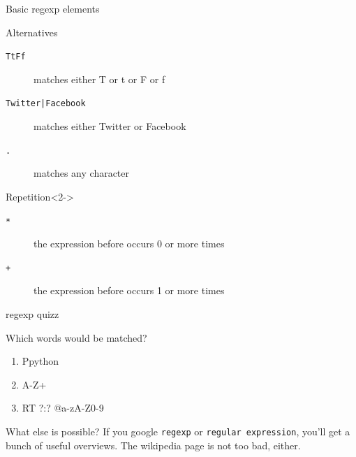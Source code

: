 \documentclass{beamer}
\begin{document}
\begin{frame}{Basic regexp elements}
\begin{block}{Alternatives}
\begin{description}
\item[{\tt{\lbrack TtFf\rbrack}}] matches either T or t or F or f
\item[{\tt{Twitter|Facebook}}] matches either Twitter or Facebook
\item[{\tt{.}}] matches any character
\end{description}
\end{block}
\begin{block}{Repetition}<2->
\begin{description}
\item[{\tt{*}}] the expression before occurs 0 or more times
\item[{\tt{+}}] the expression before occurs 1 or more times
\end{description}
\end{block}
\end{frame}

\begin{frame}{regexp quizz}
\begin{block}{Which words would be matched?}
\tt
\begin{enumerate}
\item<1-> \lbrack Pp\rbrack ython
\item<2-> \lbrack A-Z\rbrack +
\item<3-> RT ?:? @\lbrack a-zA-Z0-9\rbrack *
\end{enumerate}
\end{block}
\end{frame}

\begin{frame}{What else is possible?}
If you google {\tt{regexp}} or {\tt{regular expression}}, you'll get a bunch of useful overviews. The wikipedia page is not too bad, either. 
\end{frame}
\end{document}
